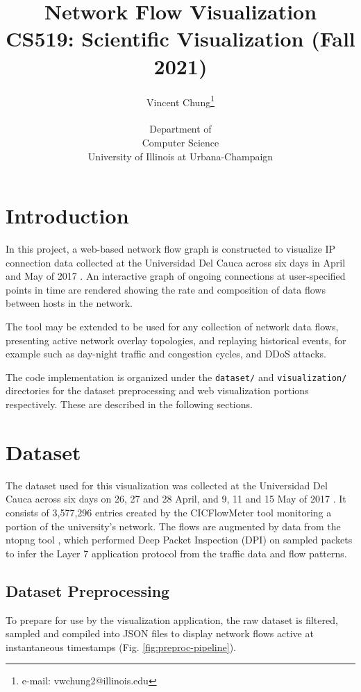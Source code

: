\documentclass{vgtc}                          %
\title{Network Flow Visualization\\CS519: Scientific Visualization (Fall 2021)}
\author{Vincent Chung\thanks{e-mail: vwchung2@illinois.edu}\\ %
     \parbox{1.4in}{\scriptsize \centering Department of\\Computer Science \\ University of Illinois at Urbana-Champaign}}
\begin{document}
\maketitle

\section{Introduction}

In this project, a web-based network flow graph is constructed to visualize IP connection data collected at the Universidad Del Cauca across six days in April and May of 2017 \cite{Rojas:2018:Kaggle}. An interactive graph of ongoing connections at user-specified points in time are rendered showing the rate and composition of data flows between hosts in the network.

The tool may be extended to be used for any collection of network data flows, presenting active network overlay topologies, and replaying historical events, for example such as day-night traffic and congestion cycles, and DDoS attacks.

The code implementation is organized under the \texttt{dataset/} and \texttt{visualization/} directories for the dataset preprocessing and web visualization portions respectively. These are described in the following sections.

\section{Dataset}

The dataset used for this visualization was collected at the Universidad Del Cauca across six days on 26, 27 and 28 April, and 9, 11 and 15 May of 2017 \cite{Rojas:2018:Kaggle}. It consists of 3,577,296 entries created by the CICFlowMeter tool \cite{cicflowmeter} monitoring a portion of the university's network. The flows are augmented by data from the ntopng tool \cite{ntopng}, which performed Deep Packet Inspection (DPI) on sampled packets to infer the Layer 7 application protocol from the traffic data and flow patterns.

\subsection{Dataset Preprocessing}

To prepare for use by the visualization application, the raw dataset is filtered, sampled and compiled into JSON files to display network flows active at instantaneous timestamps (Fig. \ref{fig:preproc-pipeline}).
\end{document}
